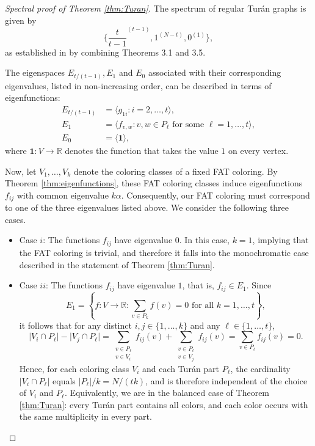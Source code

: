 \documentclass{article}
\newcommand{\R}{\mathbb{R}}
\theoremstyle{plain}
\theoremstyle{definition}
\theoremstyle{remark}
\begin{document}
\begin{proof}[Spectral proof of Theorem \ref{thm:Turan}]
    The spectrum of regular Turán graphs is given by
    \[
    \biggl\{\frac{t}{t-1}^{(t-1)},1^{(N-t)},0^{(1)}\biggr\},
    \]
    as established in \cite{SunDas2020.2} by combining Theorems 3.1 and 3.5.

    The eigenspaces $E_{t/(t-1)}, E_1$ and $E_0$ associated with their corresponding eigenvalues, listed in non-increasing order, can be described in terms of eigenfunctions:
    \begin{align*}
        E_{t/(t-1)} &= \bigl\langle g_{1i}\colon i=2,\ldots,t\bigr\rangle, \\
        E_1 &= \bigl\langle f_{v,w}\colon v,w\in P_\ell \text{ for some } \ell=1,\ldots,t\bigr\rangle,\\
        E_0 &= \langle \boldsymbol 1 \rangle,
    \end{align*} where $\boldsymbol 1: V \to \mathbb{R}$ denotes the function that takes the value $1$ on every vertex.

    Now, let $V_1,\ldots,V_k$ denote the coloring classes of a fixed FAT coloring. By Theorem \ref{thm:eigenfunctions}, these FAT coloring classes induce eigenfunctions $f_{ij}$ with common eigenvalue $k\alpha$. Consequently, our FAT coloring must correspond to one of the three eigenvalues listed above. We consider the following three cases.

\begin{itemize}
    \item Case $i$:
    The functions $f_{ij}$ have eigenvalue $0$. In this case, $k=1$, implying that the FAT coloring is trivial, and therefore it falls into the monochromatic case described in the statement of Theorem \ref{thm:Turan}.
    
   \item Case $ii$:
     The functions $f_{ij}$ have eigenvalue $1$, that is, $f_{ij}\in E_1$. Since
     \[
     E_1=\left\{f\colon V\to\R : \sum_{v\in P_k}f(v)=0 \text{ for all } k=1,\ldots,t\right\},
     \]
     it follows that for any distinct $i,j\in\{1,\ldots,k\}$ and any $\ell\in\{1,\ldots,t\}$,
     \[
     \bigl|V_i\cap P_\ell\bigr|-\bigl|V_j\cap P_\ell\bigr|
       =\sum_{\substack{v\in P_\ell\\ v\in V_i}}f_{ij}(v)
        + \sum_{\substack{v\in P_\ell\\ v\in V_j}}f_{ij}(v)
       =\sum_{v\in P_\ell}f_{ij}(v)
       =0.
     \]
     Hence, for each coloring class $V_i$ and each Turán part $P_\ell$, the cardinality $\lvert V_i \cap P_\ell\rvert$ equals $|P_{\ell}|/k=N/(tk)$, and is therefore independent of the choice of $V_i$ and $P_\ell$. Equivalently, we are in the balanced case of Theorem \ref{thm:Turan}: every Turán part contains all colors, and each color occurs with the same multiplicity in every part.
     

\end{itemize}
\end{proof}
\end{document}
